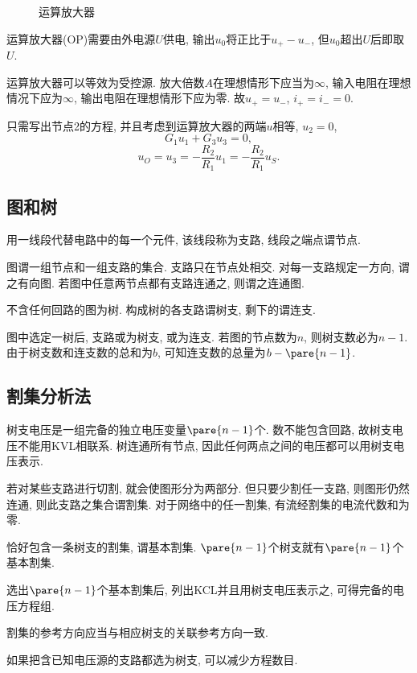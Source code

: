 \documentclass{ctexart}
\begin{document}
\begin{figure}
    \centering
    \caption{运算放大器}
\end{figure}
运算放大器(OP)需要由外电源$U$供电, 输出$u_0$将正比于$u_+-u_-$, 但$u_0$超出$U$后即取$U$.
\par
{}
运算放大器可以等效为受控源. 放大倍数$A$在理想情形下应当为$\infty$, 输入电阻在理想情况下应为$\infty$, 输出电阻在理想情形下应为零. 故$u_+ = u_-$, $i_+ = i_- = 0$. 
\begin{sample}
    \begin{ex}[比例器]
         只需写出节点2的方程, 并且考虑到运算放大器的两端$u$相等, $u_2 = 0$,
        \[ G_1u_1 + G_3u_3 = 0, \]
        \[ u_O = u_3 = -\frac{R_2}{R_1}u_1 = -\frac{R_2}{R_1}u_S. \]
    \end{ex}
    \begin{ex}
    \end{ex}
\end{sample}


\subsection{图和树} %
\label{sub:图和树}

用一线段代替电路中的每一个元件, 该线段称为支路, 线段之端点谓节点.
\par
图谓一组节点和一组支路的集合. 支路只在节点处相交. 对每一支路规定一方向, 谓之有向图. 若图中任意两节点都有支路连通之, 则谓之连通图.
\par
不含任何回路的图为树. 构成树的各支路谓树支, 剩下的谓连支.
\par
图中选定一树后, 支路或为树支, 或为连支. 若图的节点数为$n$, 则树支数必为$n-1$. 由于树支数和连支数的总和为$b$, 可知连支数的总量为$b-\pare{n-1}$. 


\subsection{割集分析法} %
\label{sub:割集分析法}

树支电压是一组完备的独立电压变量$\pare{n-1}$个. 数不能包含回路, 故树支电压不能用KVL相联系. 树连通所有节点, 因此任何两点之间的电压都可以用树支电压表示. 

\par
若对某些支路进行切割, 就会使图形分为两部分. 但只要少割任一支路, 则图形仍然连通, 则此支路之集合谓割集. 对于网络中的任一割集, 有流经割集的电流代数和为零.
\par
恰好包含一条树支的割集, 谓基本割集. $\pare{n-1}$个树支就有$\pare{n-1}$个基本割集.
\par
选出$\pare{n-1}$个基本割集后, 列出KCL并且用树支电压表示之, 可得完备的电压方程组.
\begin{remark}
    割集的参考方向应当与相应树支的关联参考方向一致.
\end{remark}
如果把含已知电压源的支路都选为树支, 可以减少方程数目. 
\end{document}
